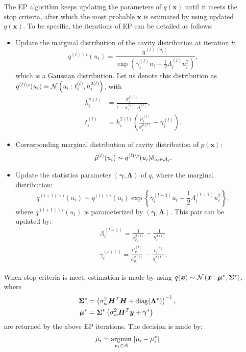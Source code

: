 \documentclass{article}
\DeclarePairedDelimiter{\diagfences}{(}{)}
\newcommand{\diag}{\operatorname{diag}\diagfences}
\begin{document}
The EP algorithm keeps updating the parameters of $q(\bm{x})$ until it meets the stop criteria, after which the most probable $\bm{x}$ is estimated by using updated $q(\bm{x})$. To be specific, the iterations of EP can be detailed as follows:
\begin{itemize}
\item Update the marginal distribution of the cavity distribution at iteration $t$:
  \begin{equation}
    q^{(l)\backslash i}(u_i) = \frac{q^{(l)(u_i)}}{\exp\left( \gamma_i^{(l)}u_i - \frac{1}{2}\Lambda_i^{(l)}u_i^2 \right)} ,
  \end{equation}
  which is a Gaussian distribution. Let us denote this distribution as $q^{(l)\backslash i}(u_i) = \mathcal{N}\left( u_i: t_i^{(l)}, h_i^{2(l)} \right)$, with
  \begin{align}
    h_i^{2 (l)} &= \frac{\sigma_i^{2 (l)}}{1-\sigma_i^{2 (l)} \Lambda_i^{(l)}}, \\
    t_i^{(l)} &= h_i^{2(l)}\left( \frac{\mu_i^{(l)}}{\sigma_i^{2(l)}} - {\gamma_i^{(l)}} \right).
  \end{align}
  

\item Corresponding marginal distribution of cavity distribution of $p(\bm{x})$:
  \begin{equation}
    \hat{p}^{(l)}(u_i) \sim q^{(l)\backslash i}(u_i)\delta_{u_i \in \mathcal{A}_i}.
  \end{equation}
\item Update the statistics parameter $\left( \bm{\gamma}, \bm{\Lambda} \right)$ of $q$, where the marginal distribution:
  \begin{equation}
    q^{(l+1)\backslash i}(u_i) \sim q^{(l)\backslash i}(u_i) \exp\left\{ \gamma_i^{(l+1)}u_i - \frac{1}{2}\Lambda_i^{(l+1)}u_i^2 \right\},
  \end{equation}
  where $q^{(t+1)\backslash i}(u_i)$ is parameterized by $\left(\bm{\gamma}, \bm{\Lambda}\right)$. This pair can be updated by:
  \begin{align}
    \Lambda_i^{(l+1)} = \frac{1}{\sigma_{p_i}^{2(l)}} - \frac{1}{h_i^{2(l)}} \\
    \gamma_i^{(l+1)} = \frac{\mu_{p_i}^{(t)}}{\sigma_{p_i}^{2(t)}} - \frac{t_i^{(t)}}{h_i^{2(t)}}.
  \end{align}
  
\end{itemize}

When stop criteria is meet, estimation is made by using $q(\bm{x}) \sim \mathcal{N}\left(\bm{x}:\bm{\mu}^{\ast}, \bm{\Sigma}^{\ast} \right)$, where
\begin{align}
  \bm{\Sigma}^{\ast} &= \left( \sigma_{w}^2\bm{H}^{T}\bm{H} +  \diag{\bm{\Lambda}^{\ast}} \right)^{-1}, \\
  \bm{\mu}^{\ast} & = \bm{\Sigma}^{\ast}\left( \sigma_{w}^2\bm{H}^{T}\bm{y} +  \bm{\gamma}^{\ast} \right)
\end{align}
are returned by the above EP iterations. The decision is made by:
\begin{equation}
  \hat{\mu}_{i} = \underset{\mu_i \in \mathcal{A}}{\operatorname{argmin}}\; | \mu_i - \mu_i^{\ast} |
\end{equation}
\end{document}
